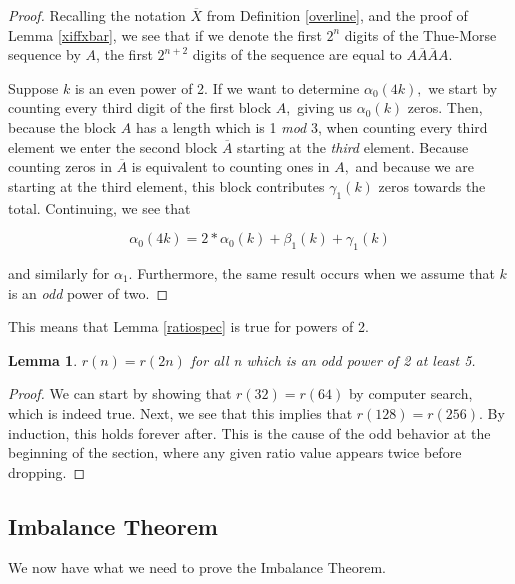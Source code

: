 \documentclass{article}
\newtheorem{lemma}{Lemma}[section]
\begin{document}
\begin{proof}

Recalling the notation $\overline{X}$ from Definition \ref{overline}, and the proof of Lemma \ref{xiffxbar}, we see that if we denote the first $2^n$ digits of the Thue-Morse sequence by $A$, the first $2^{n+2}$ digits of the sequence are equal to $A \overline{A} \overline{A} A.$

Suppose $k$ is an even power of 2. If we want to determine $\alpha_0(4k),$ we start by counting every third digit of the first block $A,$ giving us $\alpha_0(k)$ zeros. Then, because the block $A$ has a length which is 1 \emph{mod} 3, when counting every third element we enter the second block $\overline{A}$ starting at the \emph{third} element. Because counting zeros in $\overline{A}$ is equivalent to counting ones in $A,$ and because we are starting at the third element, this block contributes $\gamma_1(k)$ zeros towards the total. Continuing, we see that

$$\alpha_0(4k) = 2 * \alpha_0(k) + \beta_1(k) + \gamma_1(k)$$

and similarly for $\alpha_1.$ Furthermore, the same result occurs when we assume that $k$ is an \emph{odd} power of two.

\end{proof}

This means that Lemma \ref{ratiospec} is true for powers of 2.

\begin{lemma}
$r(n) = r(2n)$ for all n which is an odd power of 2 at least 5.
\end{lemma}

\begin{proof}

We can start by showing that $r(32) = r(64)$ by computer search, which is indeed true. Next, we see that this implies that $r(128) = r(256)$. By induction, this holds forever after. This is the cause of the odd behavior at the beginning of the section, where any given ratio value appears twice before dropping.

\end{proof}

\subsection{Imbalance Theorem}

We now have what we need to prove the Imbalance Theorem.
\end{document}
